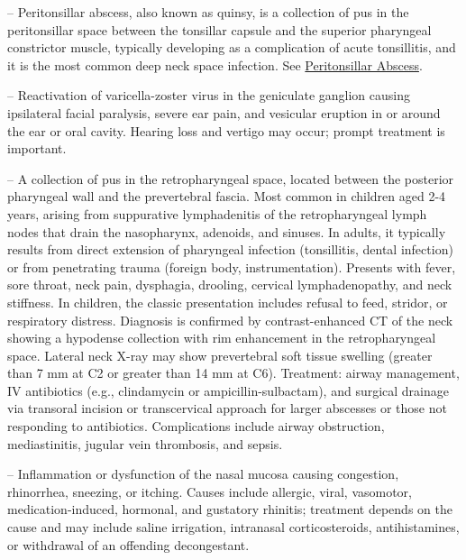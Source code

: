 -- Peritonsillar abscess, also known as quinsy, is a collection of pus in the peritonsillar space between the tonsillar capsule and the superior pharyngeal constrictor muscle, typically developing as a complication of acute tonsillitis, and it is the most common deep neck space infection. See \hyperlink{Peritonsillar Abscess}{Peritonsillar Abscess}.

-- Reactivation of varicella-zoster virus in the geniculate ganglion causing ipsilateral facial paralysis, severe ear pain, and vesicular eruption in or around the ear or oral cavity. Hearing loss and vertigo may occur; prompt treatment is important.

-- A collection of pus in the retropharyngeal space, located between the posterior pharyngeal wall and the prevertebral fascia. Most common in children aged 2-4 years, arising from suppurative lymphadenitis of the retropharyngeal lymph nodes that drain the nasopharynx, adenoids, and sinuses. In adults, it typically results from direct extension of pharyngeal infection (tonsillitis, dental infection) or from penetrating trauma (foreign body, instrumentation). Presents with fever, sore throat, neck pain, dysphagia, drooling, cervical lymphadenopathy, and neck stiffness. In children, the classic presentation includes refusal to feed, stridor, or respiratory distress. Diagnosis is confirmed by contrast-enhanced CT of the neck showing a hypodense collection with rim enhancement in the retropharyngeal space. Lateral neck X-ray may show prevertebral soft tissue swelling (greater than 7 mm at C2 or greater than 14 mm at C6). Treatment: airway management, IV antibiotics (e.g., clindamycin or ampicillin-sulbactam), and surgical drainage via transoral incision or transcervical approach for larger abscesses or those not responding to antibiotics. Complications include airway obstruction, mediastinitis, jugular vein thrombosis, and sepsis.

-- Inflammation or dysfunction of the nasal mucosa causing congestion, rhinorrhea, sneezing, or itching. Causes include allergic, viral, vasomotor, medication-induced, hormonal, and gustatory rhinitis; treatment depends on the cause and may include saline irrigation, intranasal corticosteroids, antihistamines, or withdrawal of an offending decongestant.

